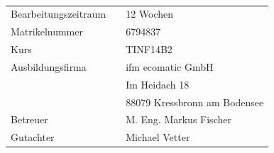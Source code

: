 	\begin{verbatim}
		
	\end{verbatim}	
	\begin{flushleft}
		\begin{tabular}{lll}
			Bearbeitungszeitraum
				&& 12 Wochen\\
			Matrikelnummer
				&& 6794837\\
			Kurs
				&& TINF14B2\\
			Ausbildungsfirma
				&& ifm ecomatic GmbH\\
				&& Im Heidach 18\\
				&& 88079 Kressbronn am Bodensee\\
			Betreuer
				&& M. Eng. Markus Fischer\\
			Gutachter
				&& Michael Vetter\\
		\end{tabular}
	\end{flushleft}